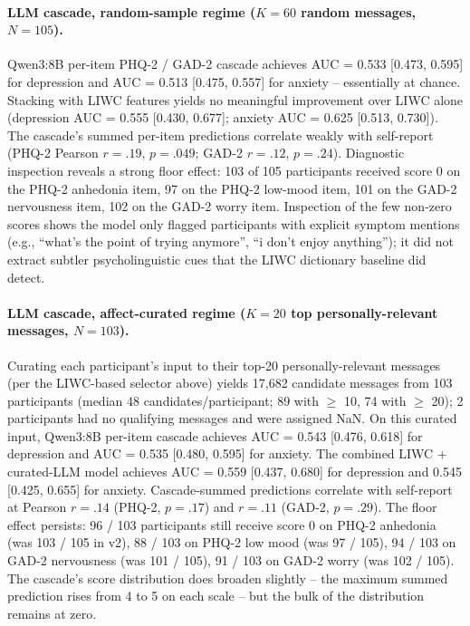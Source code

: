 \documentclass[letterpaper]{article}
\begin{document}
\paragraph{LLM cascade, random-sample regime ($K=60$ random messages, $N=105$).} Qwen3:8B per-item PHQ-2 / GAD-2 cascade achieves AUC = 0.533 [0.473, 0.595] for depression and AUC = 0.513 [0.475, 0.557] for anxiety -- essentially at chance. Stacking with LIWC features yields no meaningful improvement over LIWC alone (depression AUC = 0.555 [0.430, 0.677]; anxiety AUC = 0.625 [0.513, 0.730]). The cascade's summed per-item predictions correlate weakly with self-report (PHQ-2 Pearson $r=.19$, $p=.049$; GAD-2 $r=.12$, $p=.24$). Diagnostic inspection reveals a strong floor effect: 103 of 105 participants received score 0 on the PHQ-2 anhedonia item, 97 on the PHQ-2 low-mood item, 101 on the GAD-2 nervousness item, 102 on the GAD-2 worry item. Inspection of the few non-zero scores shows the model only flagged participants with explicit symptom mentions (e.g., ``what's the point of trying anymore'', ``i don't enjoy anything''); it did not extract subtler psycholinguistic cues that the LIWC dictionary baseline did detect.

\paragraph{LLM cascade, affect-curated regime ($K=20$ top personally-relevant messages, $N=103$).} Curating each participant's input to their top-20 personally-relevant messages (per the LIWC-based selector above) yields 17{,}682 candidate messages from 103 participants (median 48 candidates/participant; 89 with $\geq$ 10, 74 with $\geq$ 20); 2 participants had no qualifying messages and were assigned NaN. On this curated input, Qwen3:8B per-item cascade achieves AUC = 0.543 [0.476, 0.618] for depression and AUC = 0.535 [0.480, 0.595] for anxiety. The combined LIWC + curated-LLM model achieves AUC = 0.559 [0.437, 0.680] for depression and 0.545 [0.425, 0.655] for anxiety. Cascade-summed predictions correlate with self-report at Pearson $r=.14$ (PHQ-2, $p=.17$) and $r=.11$ (GAD-2, $p=.29$). The floor effect persists: 96 / 103 participants still receive score 0 on PHQ-2 anhedonia (was 103 / 105 in v2), 88 / 103 on PHQ-2 low mood (was 97 / 105), 94 / 103 on GAD-2 nervousness (was 101 / 105), 91 / 103 on GAD-2 worry (was 102 / 105). The cascade's score distribution does broaden slightly -- the maximum summed prediction rises from 4 to 5 on each scale -- but the bulk of the distribution remains at zero.
\end{document}

